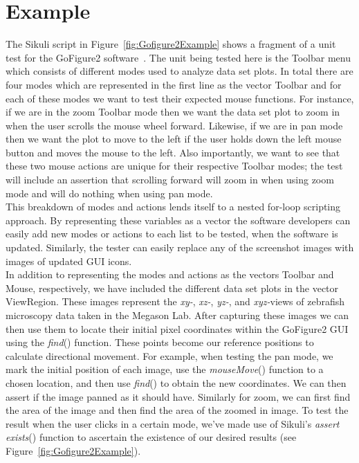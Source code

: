 \documentclass{InsightArticle}
\begin{document}
\section{Example}

The Sikuli script in Figure~\ref{fig:Gofigure2Example} shows a fragment of a
unit test for the GoFigure2 software~\cite{GoFigure2:Website}. The unit being
tested here is the Toolbar menu which consists of different modes used to
analyze data set plots. In total there are four modes which are represented in
the first line as the vector Toolbar and for each of these modes we want to test
their expected mouse functions. For instance, if we are in the zoom Toolbar
mode then we want the data set plot to zoom in when the user scrolls the mouse
wheel forward. Likewise, if we are in pan mode then we want the plot to move to
the left if the user holds down the left mouse button and moves the mouse to the
left.  Also importantly, we want to see that these two mouse actions are unique
for their respective Toolbar modes; the test will include an assertion that
scrolling forward will zoom in when using zoom mode and will do nothing when
using pan mode.\\

This breakdown of modes and actions lends itself to a nested for-loop scripting
approach. By representing these variables as a vector the software developers
can easily add new modes or actions to each list to be tested, when the software
is updated. Similarly, the tester can easily replace any of the screenshot
images with images of updated GUI icons.\\  

In addition to representing the modes and actions as the vectors Toolbar and
Mouse, respectively, we have included the different data set plots in the
vector ViewRegion. These images represent the \emph{xy-}, \emph{xz-},
\emph{yz-}, and \emph{xyz-}views of zebrafish microscopy data taken in the
Megason Lab. After capturing these images we can then use them to locate their
initial pixel coordinates within the GoFigure2 GUI using the \emph{find}()
function. These points become our reference positions to calculate directional
movement.  For example, when testing the pan mode, we mark the initial position
of each image, use the \emph{mouseMove}() function to a chosen location, and
then use \emph{find}() to obtain the new coordinates. We can then assert if the
image panned as it should have. Similarly for zoom, we can first find the area
of the image and then find the area of the zoomed in image.  To test the result
when the user clicks in a certain mode, we've made use of Sikuli's \emph{assert
exists}() function to ascertain the existence of our desired results (see
Figure~\ref{fig:Gofigure2Example}).\\
\end{document}
